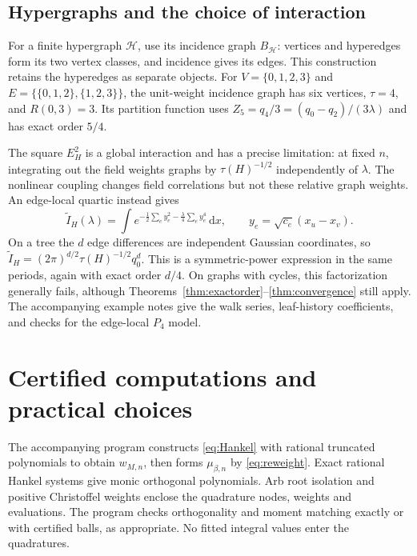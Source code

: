 \documentclass[11pt]{article}
\theoremstyle{definition}
\newcommand{\dd}{\,\mathrm d}
\numberwithin{equation}{section}
\begin{document}
\subsection*{Hypergraphs and the choice of interaction}
For a finite hypergraph $\mathcal H$, use its incidence graph
$B_{\mathcal H}$: vertices and hyperedges form its two vertex classes,
and incidence gives its edges. This construction retains the hyperedges
as separate objects. For
$V=\{0,1,2,3\}$ and $E=\{\{0,1,2\},\{1,2,3\}\}$, the unit-weight
incidence graph has six vertices, $\tau=4$, and $R(0,3)=3$.
Its partition function uses $Z_5=q_4/3=(q_0-q_2)/(3\lambda)$ and
has exact order $5/4$.

\begin{table}[ht]
\centering
\small
\caption{Rewrite and incidence graphs with unit conductances. The
resistance is between initial and terminal states, between antipodes
for $Q_k$, or between vertices $0,3$ in the hypergraph example.
Bounds use 16 Gauss nodes and 17 Radau nodes at minimal order;
endpoints are rounded outward.}\label{tab:rewrite}
\end{table}

The square $E_H^2$ is a global interaction and has a precise limitation:
at fixed $n$, integrating out the field weights graphs by
$\tau(H)^{-1/2}$ independently of $\lambda$. The nonlinear coupling
changes field correlations but not these relative graph weights.
An edge-local quartic instead gives
\[
 \widetilde I_H(\lambda)=\int
 e^{-\frac12\sum_e y_e^2-\frac\lambda4\sum_e y_e^4}\dd x,
 \qquad y_e=\sqrt{c_e}(x_u-x_v).
\]
On a tree the $d$ edge differences are independent Gaussian coordinates,
so $\widetilde I_H=(2\pi)^{d/2}\tau(H)^{-1/2}q_0^d$.
This is a symmetric-power expression in the same periods, again with
exact order $d/4$. On graphs with cycles, this factorization generally
fails, although Theorems~\ref{thm:exactorder}--\ref{thm:convergence}
still apply. The accompanying example notes give the walk series,
leaf-history coefficients, and checks for the edge-local $P_4$ model.

\section{Certified computations and practical choices}\label{sec:computations}
The accompanying program constructs \eqref{eq:Hankel} with rational
truncated polynomials to obtain $w_{M,n}$, then forms
$\mu_{\beta,n}$ by \eqref{eq:reweight}. Exact rational Hankel systems
give monic orthogonal polynomials. Arb root isolation and positive
Christoffel weights enclose the quadrature nodes, weights and evaluations.
The program checks orthogonality and moment matching exactly or with
certified balls, as appropriate. No fitted integral values enter the
quadratures.
\end{document}
